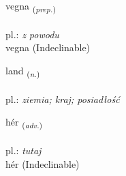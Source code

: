 \documentclass[frontgrid, backgrid]{flacards}\usepackage[]{graphicx}\usepackage[]{xcolor}
\begin{document}
{vegna \small{\textsubscript{(\textit{prep.})}} \\[1ex]
\textphonetic{[vɛkna]} \\
pl.: \emph{z powodu} \\  [2ex]
vegna (Indeclinable)}

\renewcommand{\flhead}{\vskip5pt \fboxsep=0pt {\small\bfseries\footnotesize Nafnorð | rzeczownik}}
\renewcommand{\fcfoot}{\vskip5pt \fboxsep=0pt \hspace{2pt}{\small\bfseries\footnotesize 1K}}

\renewcommand{\blhead}{\vskip5pt {\small\bfseries\footnotesize Nafnorð | rzeczownik }}
\renewcommand{\bcfoot}{\vskip5pt \hspace{2pt}{\small\bfseries\footnotesize 1K}}


{land \small{\textsubscript{(\textit{n.})}} \\[1ex] %
\textphonetic{[lant]} \\
pl.: \emph{ziemia; kraj; posiadłość} \\  [2ex]
\renewcommand*{\arraystretch}{0.8}
}


\renewcommand{\flhead}{\vskip5pt \fboxsep=0pt {\small\bfseries\footnotesize Atviksorð | przysłówek}}
\renewcommand{\fcfoot}{\vskip5pt \fboxsep=0pt \hspace{2pt}{\small\bfseries\footnotesize 1K}}

\renewcommand{\blhead}{\vskip5pt {\small\bfseries\footnotesize Atviksorð | przysłówek }}
\renewcommand{\bcfoot}{\vskip5pt \hspace{2pt}{\small\bfseries\footnotesize 1K}}


{hér \small{\textsubscript{(\textit{adv.})}} \\[1ex]
\textphonetic{[çɛːr]} \\
pl.: \emph{tutaj} \\  [2ex]
hér (Indeclinable)}
\end{document}
